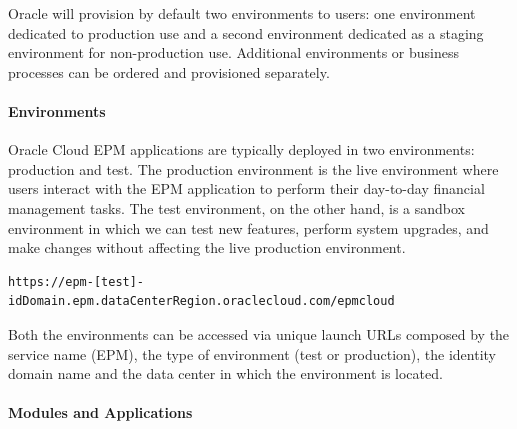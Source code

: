 \documentclass[12pt,a4paper,openright,twoside]{book}
\begin{document}
Oracle will provision by default two environments to users: one environment dedicated to production use and a second environment dedicated as a staging environment for non-production use.
%
Additional environments or business processes can be ordered and provisioned separately.

\paragraph{Environments}

Oracle Cloud EPM applications are typically deployed in two environments: production and test.
%
The production environment is the live environment where users interact with the EPM application to perform their day-to-day financial management tasks.
%
The test environment, on the other hand, is a sandbox environment in which we can test new features, perform system upgrades, and make changes without affecting the live production environment. \\

\begin{lstlisting}
https://epm-[test]-idDomain.epm.dataCenterRegion.oraclecloud.com/epmcloud
\end{lstlisting}

Both the environments can be accessed via unique launch URLs composed by the service name (EPM), the type of environment (test or production), the identity domain name and the data center in which the environment is located.

\paragraph{Modules and Applications}
\end{document}
